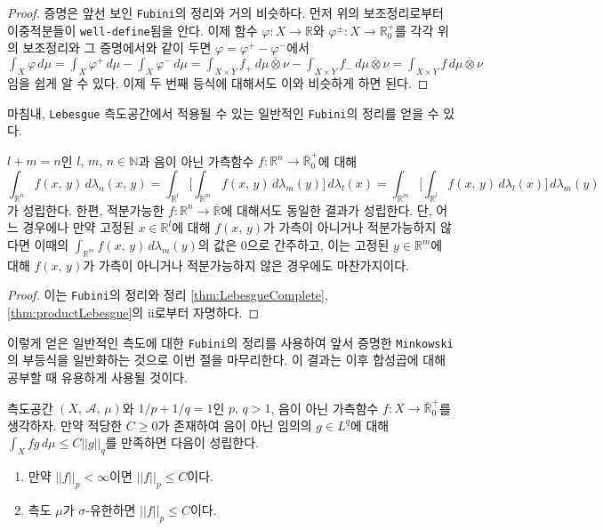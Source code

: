 \begin{proof}
    증명은 앞선 보인 \texttt{Fubini}의 정리와 거의 비슷하다. 먼저 위의 보조정리로부터 이중적분들이 \texttt{well-define}됨을 안다. 이제 함수 $\varphi:X\to\mathbb{R}$와 $\varphi^\pm:X\to\mathbb{R}^+_0$를 각각 위의 보조정리와 그 증명에서와 같이 두면 $\varphi=\varphi^+-\varphi^-$에서 $\int_X\varphi\,d\mu=\int_X\varphi^+\,d\mu-\int_X\varphi^-\,d\mu=\int_{X\times Y}f_+\,d\overline{\mu\otimes\nu}-\int_{X\times Y}f_-\,d\overline{\mu\otimes\nu}=\int_{X\times Y}f\,d\overline{\mu\otimes\nu}$임을 쉽게 알 수 있다. 이제 두 번째 등식에 대해서도 이와 비슷하게 하면 된다.
\end{proof}

마침내, \texttt{Lebesgue} 측도공간에서 적용될 수 있는 일반적인 \texttt{Fubini}의 정리를 얻을 수 있다.

\begin{corollary}
    $l+m=n$인 $l,\,m,\,n\in\mathbb{N}$과 음이 아닌 가측함수 $f:\mathbb{R}^n\to\overline{\mathbb{R}}^+_0$에 대해
    \begin{equation*}
        \int_{\mathbb{R}^n}f(x,\,y)\,d\lambda_n(x,\,y)=\int_{\mathbb{R}^l}\bigg[\int_{\mathbb{R}^m}f(x,\,y)\,d\lambda_m(y)\bigg]\,d\lambda_l(x)=\int_{\mathbb{R}^m}\bigg[\int_{\mathbb{R}^l}f(x,\,y)\,d\lambda_l(x)\bigg]\,d\lambda_m(y)
    \end{equation*}
    가 성립한다. 한편, 적분가능한 $f:\mathbb{R}^n\to\overline{\mathbb{R}}$에 대해서도 동일한 결과가 성립한다. 단, 어느 경우에나 만약 고정된 $x\in\mathbb{R}^l$에 대해 $f(x,\,y)$가 가측이 아니거나 적분가능하지 않다면 이때의 $\int_{\mathbb{R}^m}f(x,\,y)\,d\lambda_m(y)$의 값은 0으로 간주하고, 이는 고정된 $y\in\mathbb{R}^m$에 대해 $f(x,\,y)$가 가측이 아니거나 적분가능하지 않은 경우에도 마찬가지이다.
\end{corollary}

\begin{proof}
    이는 \texttt{Fubini}의 정리와 정리 \ref{thm:LebesgueComplete}, \ref{thm:productLebesgue}의 ii로부터 자명하다.
\end{proof}

이렇게 얻은 일반적인 측도에 대한 \texttt{Fubini}의 정리를 사용하여 앞서 증명한 \texttt{Minkowski}의 부등식을 일반화하는 것으로 이번 절을 마무리한다. 이 결과는 이후 합성곱에 대해 공부할 때 유용하게 사용될 것이다.

\begin{lemma}
    측도공간 $(X,\,\mathcal{A},\,\mu)$와 $1/p+1/q=1$인 $p,\,q>1$, 음이 아닌 가측함수 $f:X\to\overline{\mathbb{R}}_0^+$를 생각하자. 만약 적당한 $C\geq0$가 존재하여 음이 아닌 임의의 $g\in L^q$에 대해 $\int_Xfg\,d\mu\leq C||g||_q$를 만족하면 다음이 성립한다.
    \begin{enumerate}
        \item 만약 $||f||_p<\infty$이면 $||f||_p\leq C$이다.
        \item 측도 $\mu$가 $\sigma$-유한하면 $||f||_p\leq C$이다.
    \end{enumerate}
\end{lemma}

